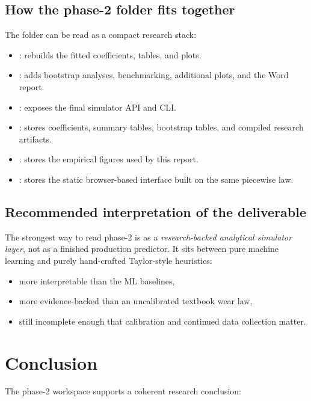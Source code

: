 \documentclass[11pt,a4paper]{article}
\begin{document}
\subsection{How the phase-2 folder fits together}

The folder can be read as a compact research stack:

\begin{itemize}[leftmargin=1.6em]
\item {}: rebuilds the fitted coefficients, tables, and plots.
\item {}: adds bootstrap analyses, benchmarking, additional plots, and the Word report.
\item {}: exposes the final simulator API and CLI.
\item {}: stores coefficients, summary tables, bootstrap tables, and compiled research artifacts.
\item {}: stores the empirical figures used by this report.
\item {}: stores the static browser-based interface built on the same piecewise law.
\end{itemize}

\subsection{Recommended interpretation of the deliverable}

The strongest way to read phase-2 is as a \emph{research-backed analytical simulator layer}, not as a finished production
predictor. It sits between pure machine learning and purely hand-crafted Taylor-style heuristics:

\begin{itemize}[leftmargin=1.6em]
\item more interpretable than the ML baselines,
\item more evidence-backed than an uncalibrated textbook wear law,
\item still incomplete enough that calibration and continued data collection matter.
\end{itemize}

\section{Conclusion}

The phase-2 workspace supports a coherent research conclusion:
\end{document}

